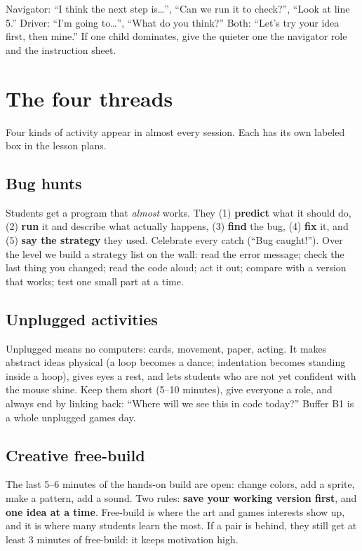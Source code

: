 \documentclass[level=1,teacher]{kidscode}
\begin{document}
\begin{tip}
Navigator: \enquote{I think the next step is\dots}, \enquote{Can we run it to check?}, \enquote{Look at line 5.}
Driver: \enquote{I'm going to\dots}, \enquote{What do you think?}
Both: \enquote{Let's try your idea first, then mine.}
If one child dominates, give the quieter one the navigator role and the instruction sheet.
\end{tip}

\section{The four threads}
Four kinds of activity appear in almost every session. Each has its own labeled box in the lesson plans.

\subsection{Bug hunts}
\begin{bughunt}
Students get a program that \emph{almost} works. They (1) \textbf{predict} what it should do, (2) \textbf{run}
it and describe what actually happens, (3) \textbf{find} the bug, (4) \textbf{fix} it, and (5) \textbf{say
the strategy} they used. Celebrate every catch (\enquote{Bug caught!}). Over the level we build a
strategy list on the wall: read the error message; check the last thing you changed; read the code aloud;
act it out; compare with a version that works; test one small part at a time.
\end{bughunt}

\subsection{Unplugged activities}
\begin{unplugged}
Unplugged means no computers: cards, movement, paper, acting. It makes abstract ideas physical
(a loop becomes a dance; indentation becomes standing inside a hoop), gives eyes a rest, and lets
students who are not yet confident with the mouse shine. Keep them short (5--10 minutes), give
everyone a role, and always end by linking back: \enquote{Where will we see this in code today?}
Buffer B1 is a whole unplugged games day.
\end{unplugged}

\subsection{Creative free-build}
\begin{freebuild}
The last 5--6 minutes of the hands-on build are open: change colors, add a sprite, make a pattern,
add a sound. Two rules: \textbf{save your working version first}, and \textbf{one idea at a time}.
Free-build is where the art and games interests show up, and it is where many students learn the most.
If a pair is behind, they still get at least 3 minutes of free-build: it keeps motivation high.
\end{freebuild}
\end{document}
